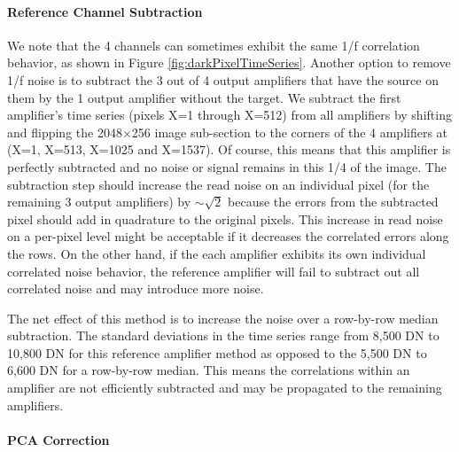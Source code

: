 \documentclass[]{aastex62}
\begin{document}
\paragraph{Reference Channel Subtraction}
We note that the 4 channels can sometimes exhibit the same 1/f correlation behavior, as shown in Figure \ref{fig:darkPixelTimeSeries}.
Another option to remove 1/f noise is to subtract the 3 out of 4 output amplifiers that have the source on them by the 1 output amplifier without the target.
We subtract the first amplifier's time series (pixels X=1 through X=512) from all amplifiers by shifting and flipping the 2048$\times$256 image sub-section to the corners of the 4 amplifiers at (X=1, X=513, X=1025 and X=1537).
Of course, this means that this amplifier is perfectly subtracted and no noise or signal remains in this 1/4 of the image.
The subtraction step should increase the read noise on an individual pixel (for the remaining 3 output amplifiers) by $\sim \sqrt{2}$ because the errors from the subtracted pixel should add in quadrature to the original pixels.
This increase in read noise on a per-pixel level might be acceptable if it decreases the correlated errors along the rows.
On the other hand, if the each amplifier exhibits its own individual correlated noise behavior, the reference amplifier will fail to subtract out all correlated noise and may introduce more noise.

The net effect of this method is to increase the noise over a row-by-row median subtraction.
The standard deviations in the time series range from 8,500 DN to 10,800 DN for this reference amplifier method as opposed to the 5,500 DN to 6,600 DN for a row-by-row median.
This means the correlations within an amplifier are not efficiently subtracted and may be propagated to the remaining amplifiers.

\paragraph{PCA Correction}
\end{document}
